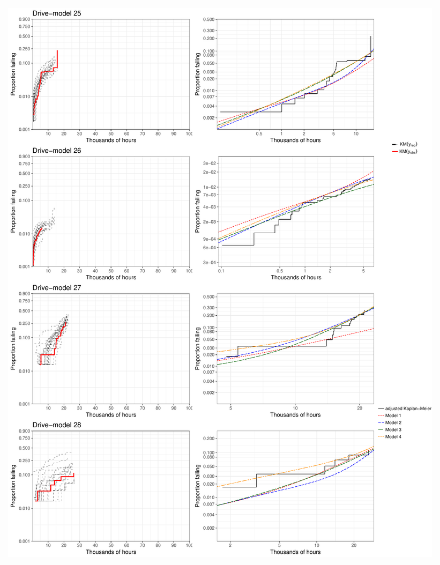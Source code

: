 \documentclass[12pt]{article}
\begin{document}
\begin{figure}[H]
\includegraphics[width=\textwidth]{ppcheck-v3-7.pdf}
\end{figure}
\end{document}
